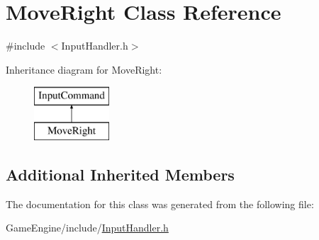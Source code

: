 \hypertarget{class_move_right}{}\section{Move\+Right Class Reference}
\label{class_move_right}


{\ttfamily \#include $<$Input\+Handler.\+h$>$}

Inheritance diagram for Move\+Right\+:\begin{figure}[H]
\begin{center}
\leavevmode
\includegraphics[height=2.000000cm]{class_move_right}
\end{center}
\end{figure}
\subsection*{Additional Inherited Members}


The documentation for this class was generated from the following file\+:\begin{DoxyCompactItemize}
\item 
Game\+Engine/include/\mbox{\hyperlink{_input_handler_8h}{Input\+Handler.\+h}}\end{DoxyCompactItemize}
